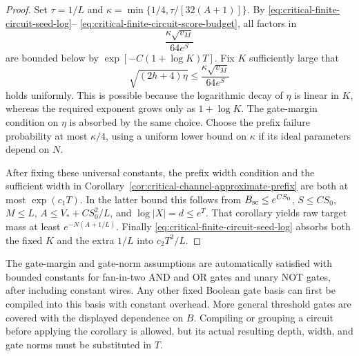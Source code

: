 \begin{proof}
Set $\tau=1/L$ and
$\kappa=\min\{1/4,\tau/[32(A+1)]\}$.  By
\eqref{eq:critical-finite-circuit-seed-log}--
\eqref{eq:critical-finite-circuit-score-budget}, all factors in
\[
 \frac{\kappa\sqrt{v_M}}{64e^S}
\]
are bounded below by $\exp[-C(1+\log K)T]$.  Fix $K$ sufficiently
large that
\[
 \sqrt{(2h+4)\eta}
 \le\frac{\kappa\sqrt{v_M}}{64e^S}
\]
holds uniformly.  This is possible because the logarithmic decay of
$\eta$ is linear in $K$, whereas the required exponent grows only
as $1+\log K$.  The gate-margin condition on $\eta$ is absorbed
by the same choice.  Choose the prefix failure probability at most
$\kappa/4$, using a uniform lower bound on $\kappa$ if its ideal
parameters depend on $N$.

After fixing these universal constants, the prefix width condition
and the sufficient width in
Corollary~\ref{cor:critical-channel-approximate-prefix} are both
at most $\exp(c_1T)$.  In the latter bound this follows from
$B_{\rm sc}\le e^{CS_0}$, $S\le CS_0$, $M\le L$,
$A\le V_*+CS_0^2/L$, and $\log|X|=d\le e^T$.
That corollary yields raw target mass at least $e^{-N(A+1/L)}$.
Finally \eqref{eq:critical-finite-circuit-seed-log} absorbs both the
fixed $K$ and the extra $1/L$ into $c_2T^2/L$.
\end{proof}

The gate-margin and gate-norm assumptions are automatically satisfied
with bounded constants for fan-in-two AND and OR gates and unary NOT
gates, after including constant wires.  Any other fixed Boolean gate
basis can first be compiled into this basis with constant overhead.
More general threshold gates are covered
with the displayed dependence on $B$.  Compiling or grouping a circuit
before applying the corollary is allowed, but its actual resulting
depth, width, and gate norms must be substituted in $T$.
